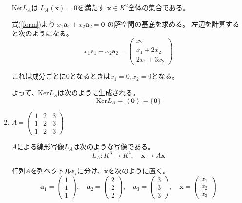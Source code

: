 \documentclass[12pt,b5paper]{ltjsarticle}
\begin{document}
\begin{enumerate}
      $\mathrm{Ker}L_A$は
      $L_A(\bm{x})=0$を満たす
      $\bm{x}\in K^2$全体の集合である。

      式(\ref{form})より
      $x_1\bm{a}_1 + x_2\bm{a}_2=\bm{0}$
      の解空間の基底を求める。
      左辺を計算すると次のようになる。
      \begin{equation}
       x_1\bm{a}_1 + x_2\bm{a}_2
          = \begin{pmatrix} x_2 \\ x_1+2x_2 \\ 2x_1+ 3x_2 \end{pmatrix}
      \end{equation}

      これは成分ごとに0となるときは$x_1=0,x_2=0$となる。

      よって、$\mathrm{Ker}L_A$は次のように生成される。
      \begin{equation}
       \mathrm{Ker}L_A
        = \left\langle \bm{0} \right\rangle
        = \{\bm{0}\}
      \end{equation}

      \hrulefill

 \item
      $A=\begin{pmatrix} 1 & 2 & 3 \\ 1 & 2 & 3 \\ 1 & 2 & 3 \end{pmatrix}$

      \dotfill

      $A$による線形写像$L_A$は次のような写像である。
      \begin{equation}
       L_A : K^3 \to K^3 ,\quad \bm{x} \to A\bm{x}
      \end{equation}

      行列$A$を列ベクトル$\bm{a}_i$に分け、$\bm{x}$を次のように置く。
      \begin{equation}
        \bm{a}_1= \begin{pmatrix} 1 \\ 1 \\ 1 \end{pmatrix}
        ,\quad
        \bm{a}_2= \begin{pmatrix} 2 \\ 2 \\ 2 \end{pmatrix}
        ,\quad
        \bm{a}_3= \begin{pmatrix} 3 \\ 3 \\ 3 \end{pmatrix}
        ,\quad
        \bm{x}=\begin{pmatrix} x_1 \\ x_2 \\ x_3 \end{pmatrix}
      \end{equation}


\end{enumerate}
\end{document}
